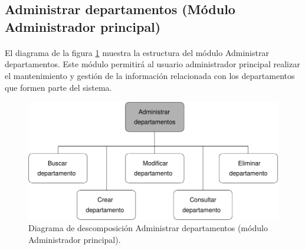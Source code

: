 \subsection{Administrar departamentos (Módulo Administrador principal)}

  \paragraph{}El diagrama de la figura
  \ref{diagramaDescomposicionAdministrarDepartamentos} muestra la estructura del
  módulo Administrar departamentos. Este módulo permitirá al usuario
  administrador principal realizar el mantenimiento y gestión de la información
  relacionada con los departamentos que formen parte del sistema.


  \begin{figure}[!ht]
    \begin{center}
      \includegraphics[]{11.Disenyo_Arquitectonico/11.2.Diagramas_Descomposicion/11.2.2.Modulo_administrador_principal/AdministrarBBDD/AdministrarDepartamentos/Diagramas/administrar_departamentos.pdf}
      \caption{Diagrama de descomposición Administrar departamentos (módulo Administrador principal).}
      \label{diagramaDescomposicionAdministrarDepartamentos}
    \end{center}
  \end{figure}
